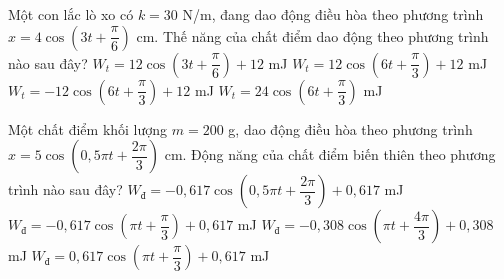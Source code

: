 \begin{ex} %
Một con lắc lò xo có $k = 30$ N/m, đang dao động điều hòa theo phương trình $x = 4\cos(3t + \dfrac{\pi}{6})$ cm. Thế năng của chất điểm dao động theo phương trình nào sau đây?
\choice
{$W_t = 12\cos(3t + \dfrac{\pi}{6}) + 12$ mJ}
{\True $W_t = 12\cos(6t + \dfrac{\pi}{3}) + 12$ mJ}
{$W_t = -12\cos(6t + \dfrac{\pi}{3}) + 12$ mJ}
{$W_t = 24\cos(6t + \dfrac{\pi}{3})$ mJ}
\end{ex} 

\begin{ex}%
Một chất điểm khối lượng $ m = 200$ g, dao động điều hòa theo phương trình $x = 5\cos(0,5\pi t + \dfrac{2\pi}{3})$ cm. Động năng của chất điểm biến thiên theo phương trình nào sau đây?
\choice
{$W_{\text{đ}} = -0,617\cos(0,5\pi t + \dfrac{2\pi}{3}) + 0,617$ mJ}
{$W_{\text{đ}} = -0,617\cos(\pi t + \dfrac{\pi}{3}) + 0,617$ mJ}
{\True $W_{\text{đ}} = -0,308\cos(\pi t + \dfrac{4\pi}{3}) + 0,308$ mJ}
{$W_{\text{đ}} = 0,617\cos(\pi t + \dfrac{\pi}{3}) + 0,617$ mJ}
\end{ex} 



